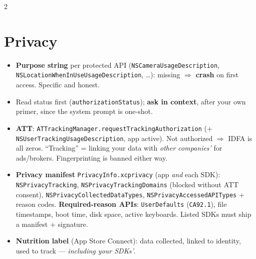 \documentclass[8pt]{extarticle}
\begin{document}
\begin{multicols}{2}
\section{Privacy}
\begin{itemize}
  \item \textbf{Purpose string} per protected API
        (\texttt{NSCameraUsageDescription},
        \texttt{NSLocationWhenInUseUsageDescription}, …): missing $\Rightarrow$
        \textbf{crash} on first access. Specific and honest.
  \item Read status first (\texttt{authorizationStatus}); \textbf{ask in
        context}, after your own primer, since the system prompt is one-shot.
  \item \textbf{ATT}: \texttt{ATTrackingManager.requestTrackingAuthorization}
        (+ \texttt{NSUserTrackingUsageDescription}, app active). Not
        authorized $\Rightarrow$ IDFA is all zeros. ``Tracking'' = linking
        your data with \emph{other companies'} for ads/brokers.
        Fingerprinting is banned either way.
  \item \textbf{Privacy manifest} \texttt{PrivacyInfo.xcprivacy} (app
        \emph{and} each SDK): \texttt{NSPrivacyTracking},
        \texttt{NSPrivacyTrackingDomains} (blocked without ATT consent),
        \texttt{NSPrivacyCollectedDataTypes},
        \texttt{NSPrivacyAccessedAPITypes} + reason codes.
        \textbf{Required-reason APIs}: \texttt{UserDefaults}
        (\texttt{CA92.1}\unverified), file timestamps, boot time, disk space, active
        keyboards. Listed SDKs must ship a manifest + signature.
  \item \textbf{Nutrition label} (App Store Connect): data collected,
        linked to identity, used to track — \emph{including your SDKs'}.
\end{itemize}

\columnbreak


\end{multicols}
\end{document}
